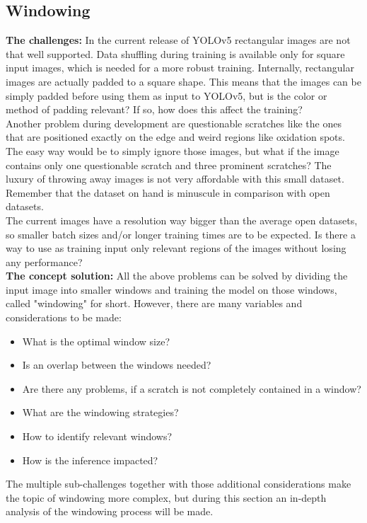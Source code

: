 \subsection{Windowing}

\textbf{The challenges:} In the current release of YOLOv5 rectangular images are not that well supported. Data shuffling during training is available only for square input images, which is needed for a more robust training. Internally, rectangular images are actually padded to a square shape. This means that the images can be simply padded before using them as input to YOLOv5, but is the color or method of padding relevant? If so, how does this affect the training? \\
Another problem during development are questionable scratches like the ones that are positioned exactly on the edge and weird regions like oxidation spots. The easy way would be to simply ignore those images, but what if the image contains only one questionable scratch and three prominent scratches? The luxury of throwing away images is not very affordable with this small dataset. Remember that the dataset on hand is minuscule in comparison with open datasets. \\


The current images have a resolution way bigger than the average open datasets, so smaller batch sizes and/or longer training times are to be expected. Is there a way to use as training input only relevant regions of the images without losing any performance?\\

\textbf{The concept solution:} All the above problems can be solved by dividing the input image into smaller windows and training the model on those windows, called "windowing" for short.  However, there are many variables and considerations to be made:
\begin{itemize}
\item What is the optimal window size?
\item Is an overlap between the windows needed?
\item Are there any problems, if a scratch is not completely contained in a window?
\item What are the windowing strategies?
\item How to identify relevant windows?
\item How is the inference impacted?
\end{itemize}
The multiple sub-challenges together with those additional considerations make the topic of windowing more complex, but during this section an in-depth analysis of the windowing process will be made.

